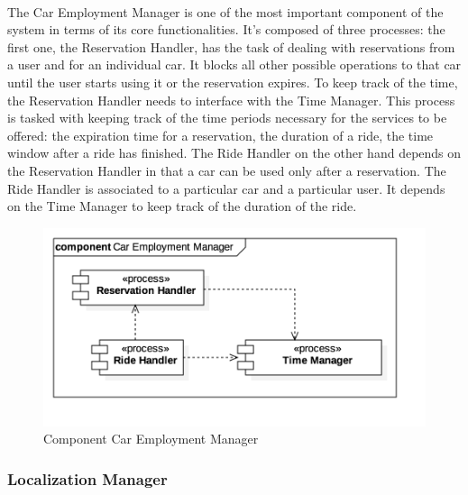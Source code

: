 		\paragraph{} The Car Employment Manager is one of the most important component of the system in terms of its core functionalities. It's composed of three processes: the first one, the Reservation Handler, has the task of dealing with reservations from a user and for an individual car. It blocks all other possible operations to that car until the user starts using it or the reservation expires. To keep track of the time, the Reservation Handler needs to interface with the Time Manager. This process is tasked with keeping track of the time periods necessary for the services to be offered: the expiration time for a reservation, the duration of a ride, the time window after a ride has finished. 
		The Ride Handler on the other hand depends on the Reservation Handler in that a car can be used only after a reservation. The Ride Handler is associated to a particular car and a particular user. It depends on the Time Manager to keep track of the duration of the ride. 
		\begin{figure}[h]
			\includegraphics[scale=0.4, center]{img/component_diagrams/04_car_employment_manager.png} %
			\caption{Component Car Employment Manager}
		\end{figure}	
\FloatBarrier

		
		
		\subsubsection*{Localization Manager}
		
		
			
